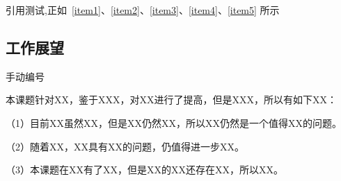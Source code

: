 引用测试,正如~\ref{item1}、\ref{item2}、\ref{item3}、\ref{item4}、\ref{item5} 所示

\subsection{工作展望}
手动编号 %

本课题针对XX，鉴于XXX，对XX进行了提高，但是XXX，所以有如下XX：

（1）目前XX虽然XX，但是XX仍然XX，所以XX仍然是一个值得XX的问题。

（2）随着XX，XX具有XX的问题，仍值得进一步XX。

（3）本课题在XX有了XX，但是XX的XX还存在XX，所以XX。


\newpage
